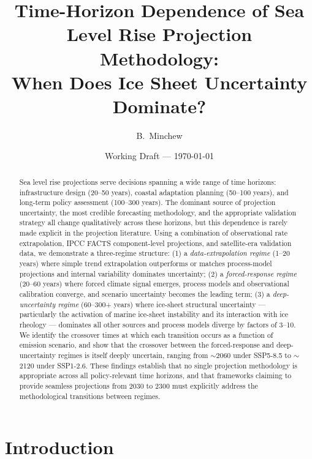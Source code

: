 \documentclass[11pt]{article}
\title{Time-Horizon Dependence of Sea Level Rise Projection Methodology:\\
  When Does Ice Sheet Uncertainty Dominate?}
\author{B.\ Minchew}
\date{Working Draft --- \today}
\begin{document}
\maketitle

\begin{abstract}
Sea level rise projections serve decisions spanning a wide range of time horizons: infrastructure design (20--50 years), coastal adaptation planning (50--100 years), and long-term policy assessment (100--300 years).  The dominant source of projection uncertainty, the most credible forecasting methodology, and the appropriate validation strategy all change qualitatively across these horizons, but this dependence is rarely made explicit in the projection literature.  Using a combination of observational rate extrapolation, IPCC FACTS component-level projections, and satellite-era validation data, we demonstrate a three-regime structure: (1) a \emph{data-extrapolation regime} (1--20 years) where simple trend extrapolation outperforms or matches process-model projections and internal variability dominates uncertainty; (2) a \emph{forced-response regime} (20--60 years) where forced climate signal emerges, process models and observational calibration converge, and scenario uncertainty becomes the leading term; (3) a \emph{deep-uncertainty regime} (60--300+ years) where ice-sheet structural uncertainty --- particularly the activation of marine ice-sheet instability and its interaction with ice rheology --- dominates all other sources and process models diverge by factors of 3--10.  We identify the crossover times at which each transition occurs as a function of emission scenario, and show that the crossover between the forced-response and deep-uncertainty regimes is itself deeply uncertain, ranging from $\sim$2060 under SSP5-8.5 to $\sim$2120 under SSP1-2.6.  These findings establish that no single projection methodology is appropriate across all policy-relevant time horizons, and that frameworks claiming to provide seamless projections from 2030 to 2300 must explicitly address the methodological transitions between regimes.
\end{abstract}


\section{Introduction}
\label{sec:intro}
\end{document}
